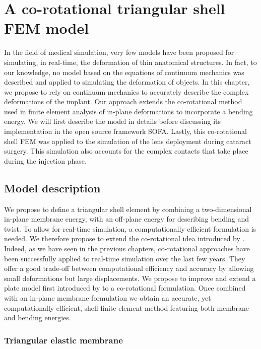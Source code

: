 \chapter{A co-rotational triangular shell FEM model}
\label{chap8}
\begin{shortAbstract}
In the field of medical simulation, very few models have been proposed for simulating, in real-time, the deformation of thin anatomical structures. In fact, to our knowledge, no model based on the equations of continuum mechanics was described and applied to simulating the deformation of objects. In this chapter, we propose to rely on continuum mechanics to accurately describe the complex deformations of the implant. Our approach extends the co-rotational method used in finite element analysis of in-plane deformations to incorporate a bending energy. We will first describe the model in details before discussing its implementation in the open source framework SOFA. Lastly, this co-rotational shell FEM was applied to the simulation of the lens deployment during cataract surgery. This simulation also accounts for the complex contacts that take place during the injection phase.
\end{shortAbstract}


\section{Model description}

We propose to define a triangular shell element by combining a two-dimensional in-plane membrane energy, with an off-plane energy for describing bending and twist. To allow for real-time simulation, a computationally efficient formulation is needed. We therefore propose to extend the co-rotational idea introduced by \cite{Felippa00}. Indeed, as we have seen in the previous chapters, co-rotational approaches have been successfully applied to real-time simulation over the last few years. They offer a good trade-off between computational efficiency and accuracy by allowing small deformations but large displacements. We propose to improve and extend a plate model first introduced by \cite{Przemieniecki85} to a co-rotational formulation. Once combined with an in-plane membrane formulation we obtain an accurate, yet computationally efficient, shell finite element method featuring both membrane and bending energies. 

\subsection{Triangular elastic membrane}

